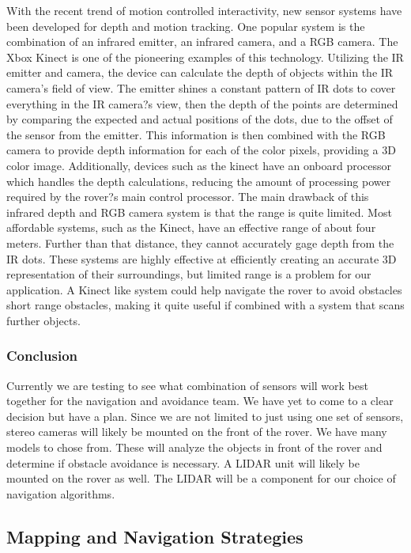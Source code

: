\documentclass[10pt, oneside,onecolumn]{IEEEtran}
\begin{document}
With the recent trend of motion controlled interactivity, new sensor systems have been developed for depth and motion tracking. One popular system is the combination of an infrared emitter, an infrared camera, and a RGB camera. The Xbox Kinect is one of the pioneering examples of this technology. Utilizing the IR emitter and camera, the device can calculate the depth of objects within the IR camera's field of view. The emitter shines a constant pattern of IR dots to cover everything in the IR camera?s view, then the depth of the points are determined by comparing the expected and actual positions of the dots, due to the offset of the sensor from the emitter. This information is then combined with the RGB camera to provide depth information for each of the color pixels, providing a 3D color image. Additionally, devices such as the kinect have an onboard processor which handles the depth calculations, reducing the amount of processing power required by the rover?s main control processor.
The main drawback of this infrared depth and RGB camera system is that the range is quite limited. Most affordable systems, such as the Kinect, have an effective range of about four meters. Further than that distance, they cannot accurately gage depth from the IR dots. These systems are highly effective at efficiently creating an accurate 3D representation of their surroundings, but limited range is a problem for our application. A Kinect like system could help navigate the rover to avoid obstacles short range obstacles, making it quite useful if combined with a system that scans further objects. 

\subsubsection{Conclusion}
 	Currently we are testing to see what combination of sensors will work best together for the navigation and avoidance team. We have yet to come to a clear decision but have a plan. Since we are not limited to just using one set of sensors, stereo cameras will likely be mounted on the front of the rover. We have many models to chose from. These will analyze the objects in front of the rover and determine if obstacle avoidance is necessary. A LIDAR unit will likely be mounted on the rover as well. The LIDAR will be a component for our choice of navigation algorithms.

\subsection{Mapping and Navigation Strategies} 
\end{document}
